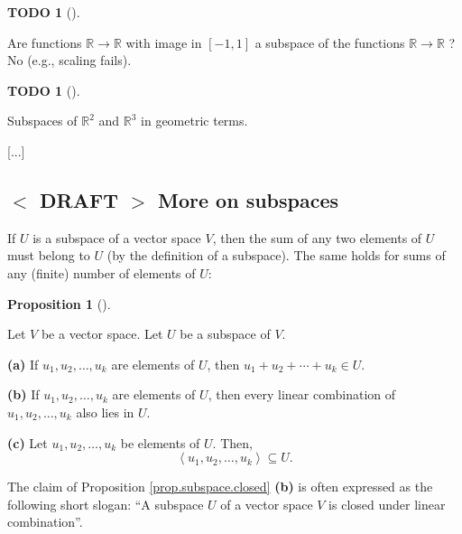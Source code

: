 \documentclass[numbers=enddot,12pt,final,onecolumn,notitlepage]{scrartcl}%
\theoremstyle{definition}
\newtheorem{prop}[theo]{Proposition}
\newenvironment{proposition}[1][]
{\begin{prop}[#1]\begin{leftbar}}
{\end{leftbar}\end{prop}}
\newtheorem{quest}[theo]{TODO}
\newenvironment{todo}[1][]
{\begin{quest}[#1]\begin{leftbar}}
{\end{leftbar}\end{quest}}
\begin{document}
\begin{todo}
Are functions $\mathbb{R}\rightarrow\mathbb{R}$ with image in $\left[
-1,1\right]  $ a subspace of the functions $\mathbb{R}\rightarrow\mathbb{R}$ ?
No (e.g., scaling fails).
\end{todo}

\begin{todo}
Subspaces of $\mathbb{R}^{2}$ and $\mathbb{R}^{3}$ in geometric terms.
\end{todo}

[...]

\subsection{\label{sect.spaces.more-on-subs}%
$<$%
DRAFT%
$>$
More on subspaces}

If $U$ is a subspace of a vector space $V$, then the sum of any two elements
of $U$ must belong to $U$ (by the definition of a subspace). The same holds
for sums of any (finite) number of elements of $U$:

\begin{proposition}
\label{prop.subspace.closed}Let $V$ be a vector space. Let $U$ be a subspace
of $V$.

\textbf{(a)} If $u_{1},u_{2},\ldots,u_{k}$ are elements of $U$, then
$u_{1}+u_{2}+\cdots+u_{k}\in U$.

\textbf{(b)} If $u_{1},u_{2},\ldots,u_{k}$ are elements of $U$, then every
linear combination of $u_{1},u_{2},\ldots,u_{k}$ also lies in $U$.

\textbf{(c)} Let $u_{1},u_{2},\ldots,u_{k}$ be elements of $U$. Then,
\[
\left\langle u_{1},u_{2},\ldots,u_{k}\right\rangle \subseteq U.
\]

\end{proposition}

The claim of Proposition \ref{prop.subspace.closed} \textbf{(b)} is often
expressed as the following short slogan: \textquotedblleft A subspace $U$ of a
vector space $V$ is closed under linear combination\textquotedblright.
\end{document}
